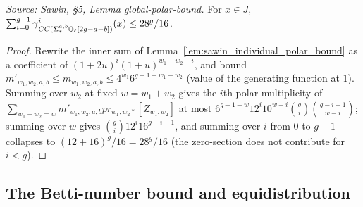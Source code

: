 \begin{lemma}
  \label{lem:sawin_global_polar_bound}
  \textit{Source: Sawin, §5, Lemma global-polar-bound.}
  For $x\in J$, $\sum_{i=0}^{g-1}\gamma^i_{\mathit{CC}(\Sigma^{a,b}_*\mathbb{Q}_\ell[2g-a-b])}(x)
  \le 28^g/16$.
\end{lemma}
\begin{proof}
  Rewrite the inner sum of Lemma~\ref{lem:sawin_individual_polar_bound} as a
  coefficient of $(1+2u)^i(1+u)^{w_1+w_2-i}$, and bound $m'_{w_1,w_2,a,b}\le
  m_{w_1,w_2,a,b}\le 4^{w_1}6^{g-1-w_1-w_2}$ (value of the generating function at
  $1$).  Summing over $w_2$ at fixed $w=w_1+w_2$ gives the $i$th polar multiplicity
  of $\sum_{w_1+w_2=w}m'_{w_1,w_2,a,b}pr_{w_1,w_2*}[Z_{w_1,w_2}]$ at most
  $6^{g-1-w}12^i10^{w-i}\binom{g}{i}\binom{g-i-1}{w-i}$; summing over $w$ gives
  $\binom{g}{i}12^i16^{g-i-1}$, and summing over $i$ from $0$ to $g-1$ collapses to
  $(12+16)^g/16=28^g/16$ (the zero-section does not contribute for $i<g$).
\end{proof}

\subsection{The Betti-number bound and equidistribution}

